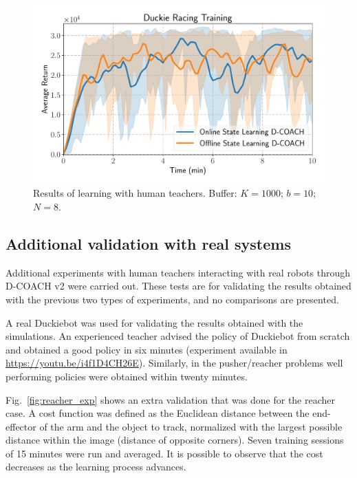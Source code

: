 \begin{figure}[H]
    \centering
    \includegraphics[width=0.9\linewidth]{imagenes/cap3/duckie_human_teacher_ICRA.pdf}
    \caption{Results of learning with human teachers. Buffer: $K = 1000$; $b = 10$; $N = 8$.}
    \label{fig:humanteachers2}
\end{figure}

\subsection{Additional validation with real systems}

Additional experiments with human teachers interacting with real robots through D-COACH v2 were carried out. These tests are for validating the results obtained with the previous two types of experiments, and no comparisons are presented.

A real Duckiebot was used for validating the results obtained with the simulations. An experienced teacher advised the policy of Duckiebot from scratch and obtained a good policy in six minutes (experiment available in \url{https://youtu.be/i4f1D4CH26E}). Similarly, in the pusher/reacher problems well performing policies were obtained within twenty minutes. 

Fig.~\ref{fig:reacher_exp} shows an extra validation that was done for the reacher case. A cost function was defined as the Euclidean distance between the end-effector of the arm and the object to track, normalized with the largest possible distance within the image (distance of opposite corners). Seven training sessions of 15 minutes were run and averaged. It is possible to observe that the cost decreases as the learning process advances. 

